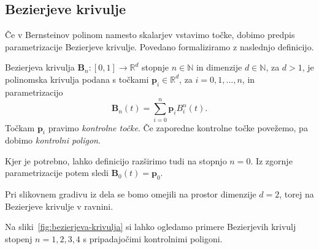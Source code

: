 \documentclass[isrm2, tisk]{fmfdelo}
\newcommand{\R}{\mathbb R}
\newcommand{\N}{\mathbb N}
\newcommand{\p}{\mathbf{p}}
\newcommand{\lilb}[2]{B_{#1}^{#2}(t)}
\newcommand{\bigbb}[1]{\textbf{B}_{#1}(t)}
\newcommand{\bernsteinsump}[2]{\sum_{#1=0}^{#2} \p_{#1}\lilb{#1}{#2}}
\begin{document}
    \subsection{Bezierjeve krivulje}
    Če v Bernsteinov polinom namesto skalarjev vstavimo točke, dobimo predpis parametrizacije Bezierjeve krivulje.
    Povedano formaliziramo z naslednjo definicijo.
    \begin{definicija}
        Bezierjeva krivulja $\mathbf{B}_n: [0,1]\to \R^d$ stopnje $n\in\N$ in dimenzije $d\in\N$, za  $d>1$, je polinomska krivulja podana s točkami $\p_i\in\R^d$, za $i=0,1,\ldots,n$, in parametrizacijo
        \[\bigbb{n}=\bernsteinsump{i}{n}.\]
        Točkam $\p_i$ pravimo \textit{kontrolne točke}.
        Če zaporedne kontrolne točke povežemo, pa dobimo \textit{kontrolni poligon}.
    \end{definicija}
    \begin{opomba}
        \label{opomba:dim-0}
        Kjer je potrebno, lahko definicijo razširimo tudi na stopnjo $n=0$.
        Iz zgornje parametrizacije potem sledi $\mathbf{B}_0(t)=\p_0$.
    \end{opomba}
    \begin{opomba}
        Pri slikovnem gradivu iz dela se bomo omejili na prostor dimenzije $d=2$, torej na Bezierjeve krivulje v ravnini.
    \end{opomba}
    Na sliki~\ref{fig:bezierjeva-krivulja} si lahko ogledamo primere Bezierjevih krivulj stopenj $n=1,2,3,4$ s pripadajočimi kontrolnimi poligoni.
\end{document}
